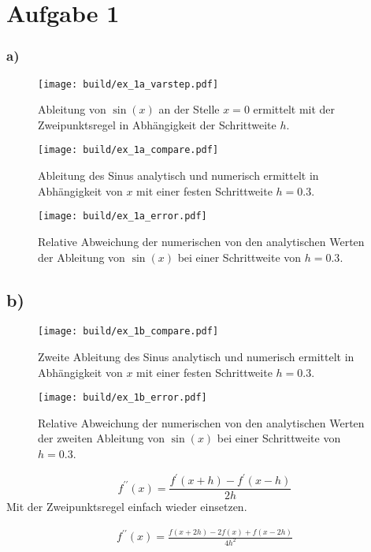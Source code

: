 \section*{Aufgabe 1}
\subsubsection*{a)}
\begin{figure}
    \centering
    \texttt{[image: build/ex\_1a\_varstep.pdf]}
    \caption{Ableitung von $\sin(x)$ an der Stelle $x=0$ ermittelt mit der Zweipunktsregel
    in Abhängigkeit der Schrittweite $h$.}
    \label{fig:h_dep}
\end{figure}

\begin{figure}
    \centering
    \texttt{[image: build/ex\_1a\_compare.pdf]}
    \caption{Ableitung des Sinus analytisch und numerisch ermittelt in Abhängigkeit von 
    $x$ mit einer festen Schrittweite $h=0.3$.}
    \label{fig:a_comp}
\end{figure}

\begin{figure}
    \centering
    \texttt{[image: build/ex\_1a\_error.pdf]}
    \caption{Relative Abweichung der numerischen von den analytischen Werten der Ableitung von $\sin(x)$
    bei einer Schrittweite von $h=0.3$.}
    \label{fig:rel_a}
\end{figure}
\FloatBarrier

\subsection*{b)}
\begin{figure}
    \centering
    \texttt{[image: build/ex\_1b\_compare.pdf]}
    \caption{Zweite Ableitung des Sinus analytisch und numerisch ermittelt in Abhängigkeit von 
    $x$ mit einer festen Schrittweite $h=0.3$.}
    \label{fig:b_comp}
\end{figure}

\begin{figure}
    \centering
    \texttt{[image: build/ex\_1b\_error.pdf]}
    \caption{Relative Abweichung der numerischen von den analytischen Werten der zweiten Ableitung von $\sin(x)$
    bei einer Schrittweite von $h=0.3$.}
    \label{fig:rel_b}
\end{figure}

\begin{equation*}
    f^{\prime \prime} (x) = \frac{f^{\prime}(x+h) - f^{\prime}(x-h)}{2h}    
\end{equation*}
Mit der Zweipunktsregel einfach wieder einsetzen.

\begin{align*}
    f^{\prime \prime} (x) = \frac{f(x+2h) - 2 f(x) + f(x-2h)}{4h^2}
\end{align*}

\FloatBarrier